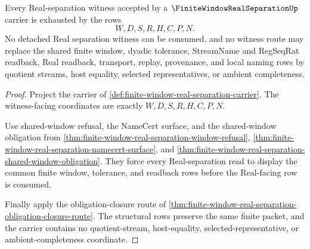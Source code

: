 \begin{theorem}
\label{thm:finite-window-real-separation-witness-exhaustion}
Every Real-separation witness accepted by a $\FiniteWindowRealSeparationUp$ carrier is exhausted by the rows
$$
W,D,S,R,H,C,P,N .
$$
No detached Real separation witness can be consumed, and no witness route may replace the shared finite window, dyadic tolerance, StreamName and RegSeqRat readback, Real readback, transport, replay, provenance, and local naming rows by quotient streams, host equality, selected representatives, or ambient completeness.
\end{theorem}
\begin{proof}
Project the carrier of \autoref{def:finite-window-real-separation-carrier}. The witness-facing coordinates are exactly $W,D,S,R,H,C,P,N$.

Use shared-window refusal, the NameCert surface, and the shared-window obligation from \autoref{thm:finite-window-real-separation-window-refusal}, \autoref{thm:finite-window-real-separation-namecert-surface}, and \autoref{thm:finite-window-real-separation-shared-window-obligation}. They force every Real-separation read to display the common finite window, tolerance, and readback rows before the Real-facing row is consumed.

Finally apply the obligation-closure route of \autoref{thm:finite-window-real-separation-obligation-closure-route}. The structural rows preserve the same finite packet, and the carrier contains no quotient-stream, host-equality, selected-representative, or ambient-completeness coordinate.
\end{proof}

